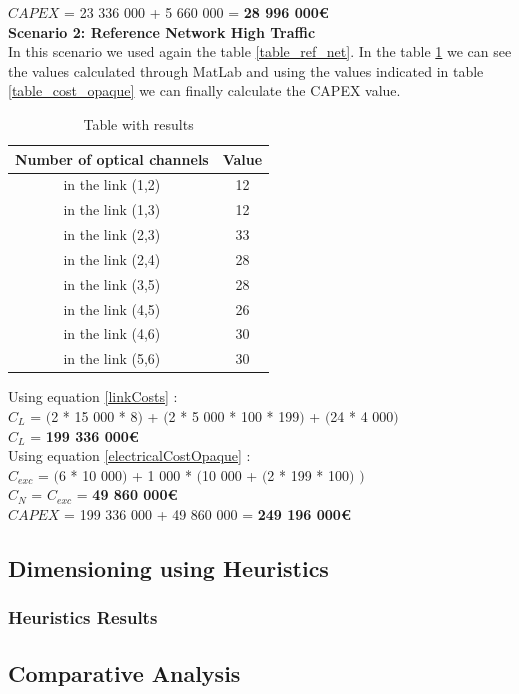 $CAPEX$ = 23 336 000 + 5 660 000 = \textbf{28 996 000\euro}\\


\textbf{Scenario 2: Reference Network High Traffic} \label{Scenario2_opaque_p} \\

In this scenario we used again the table \ref{table_ref_net}. In the table \ref{result_ILP2_p} we can see the values calculated through MatLab and using the values indicated in table \ref{table_cost_opaque} we can finally calculate the CAPEX value.\\

\begin{table}[h!]
\centering
\begin{tabular}{|| c | c||}
 \hline
 Number of optical channels & Value \\
 \hline\hline
 in the link (1,2) & 12 \\
 in the link (1,3) & 12 \\
 in the link (2,3) & 33 \\
 in the link (2,4) & 28 \\
 in the link (3,5) & 28 \\
 in the link (4,5) & 26 \\
 in the link (4,6) & 30 \\
 in the link (5,6) & 30 \\
 \hline
\end{tabular}
\caption{Table with results}
\label{result_ILP2_p}
\end{table}


Using equation \ref{linkCosts} : \\
$C_L$ = $($2 * 15 000 * 8$)$ + $($2 * 5 000 * 100 * 199$)$ + $($24 * 4 000$)$ \\
$C_L$ = \textbf{199 336 000\euro} \\

Using equation \ref{electricalCostOpaque} : \\
$C_{exc}$ = $($6 * 10 000$)$ + 1 000 * $($10 000 + $($2 * 199 * 100$)$ $)$ \\
$C_N$ = $C_{exc}$ = \textbf{49 860 000\euro} \\

$CAPEX$ = 199 336 000 + 49 860 000 = \textbf{249 196 000\euro}\\

\subsection{Dimensioning using Heuristics}

\subsubsection{Heuristics Results}

\subsection{Comparative Analysis}

